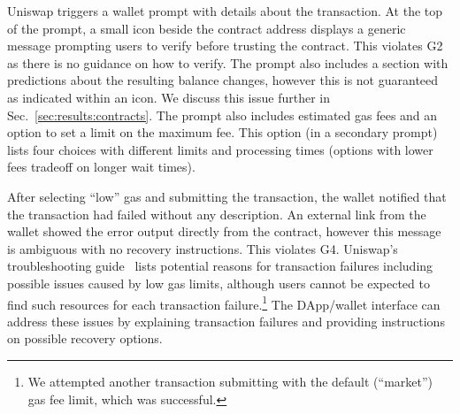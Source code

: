 \documentclass[conference]{IEEEtran}
\begin{document}

Uniswap triggers a wallet prompt with details about the transaction. %
At the top of the prompt, a small icon beside the contract address displays a generic message prompting users to verify before trusting the contract.
This violates G2 as there is no guidance on how to verify.
The prompt also includes a section with predictions about the resulting balance changes, however this is not guaranteed as indicated within an icon.
We discuss this issue further in Sec.~\ref{sec:results:contracts}.
The prompt also includes estimated gas fees and an option to set a limit on the maximum fee.
This option (in a secondary prompt) lists four choices with different limits and processing times (options with lower fees tradeoff on longer wait times).

After selecting ``low'' gas and submitting the transaction,
the wallet notified that the transaction had failed without any description.
An external link from the wallet showed the error output directly from the contract, however this message is ambiguous with no recovery instructions.
This violates G4.
Uniswap's troubleshooting guide~\cite{uniswapTransactionFail} lists potential reasons for transaction failures including possible issues caused by low gas limits, although users cannot be expected to find such resources for each transaction failure.\footnote{We attempted another transaction submitting with the default (``market'') gas fee limit, which was successful.}
The DApp/wallet interface can address these issues by explaining transaction failures and providing instructions on possible recovery options.

\end{document}
